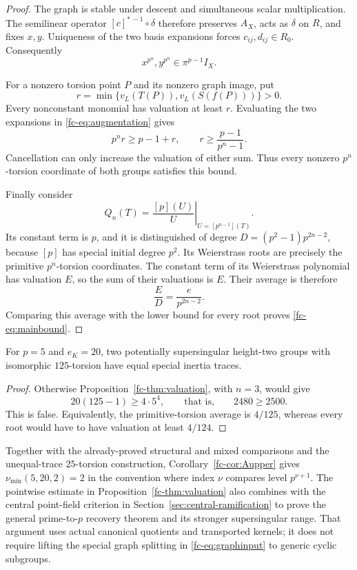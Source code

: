 \begin{proof}
The graph is stable under descent and simultaneous scalar multiplication.
The semilinear operator \([c]^{*\,-1}\circ\delta\) therefore preserves
\(A_X\), acts as \(\delta\) on \(R\), and fixes \(x,y\). Uniqueness of
the two basis expansions forces \(c_{ij},d_{ij}\in R_0\). Consequently
\begin{equation}\label{fc-eq:augmentation}
 x^{p^n},y^{p^n}\in\pi^{p-1}I_X.
\end{equation}

For a nonzero torsion point \(P\) and its nonzero graph image, put
\[
 r=\min\{v_L(T(P)),v_L(S(f(P)))\}>0.
\]
Every nonconstant monomial has
valuation at least \(r\). Evaluating the two expansions in
\eqref{fc-eq:augmentation} gives
\[
 p^n r\geq p-1+r,\qquad
 r\geq\frac{p-1}{p^n-1}.
\]
Cancellation can only increase the valuation of either sum. Thus every
nonzero \(p^n\)-torsion coordinate of both groups satisfies this bound.

Finally consider
\[
 Q_n(T)=\left.\frac{[p](U)}U\right|_{U=[p^{n-1}](T)}.
\]
Its constant term is \(p\), and it is distinguished of degree
\(D=(p^2-1)p^{2n-2}\), because \([p]\) has special initial degree
\(p^2\). Its Weierstrass roots are precisely the primitive \(p^n\)-torsion
coordinates. The constant term of its Weierstrass polynomial has
valuation \(E\), so the sum of their valuations is \(E\). Their average
is therefore
\[
 \frac ED=\frac e{p^{2n-2}}.
\]
Comparing this average with the lower bound for every root proves
\eqref{fc-eq:mainbound}.
\end{proof}

\begin{corollary}\label{fc-cor:Aupper}
For \(p=5\) and \(e_K=20\), two potentially supersingular height-two
groups with isomorphic \(125\)-torsion have equal special inertia traces.
\end{corollary}
\begin{proof}
Otherwise Proposition~\ref{fc-thm:valuation}, with \(n=3\), would give
\[
 20(125-1)\geq4\cdot5^4,
 \qquad\text{that is,}\qquad2480\geq2500.
\]
This is false. Equivalently, the primitive-torsion average is \(4/125\),
whereas every root would have to have valuation at least \(4/124\).
\end{proof}

Together with the already-proved structural and mixed comparisons and the
unequal-trace \(25\)-torsion construction, Corollary~\ref{fc-cor:Aupper} gives
\(\nu_{\min}(5,20,2)=2\) in the convention where index \(\nu\) compares
level \(p^{\nu+1}\). The pointwise estimate in Proposition~\ref{fc-thm:valuation} also combines with the central point-field criterion in Section~\ref{sec:central-ramification} to prove the general prime-to-$p$ recovery theorem and its stronger supersingular range. That argument uses actual canonical quotients and transported kernels; it does not require lifting the special graph splitting in \eqref{fc-eq:graphinput} to generic cyclic subgroups.
